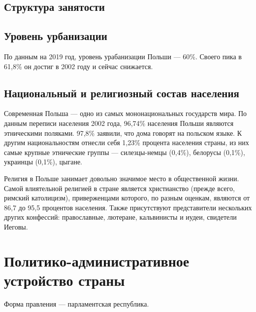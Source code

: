 \documentclass[12pt]{article}
\begin{document}
\subsection{Структура занятости}

\subsection{Уровень урбанизации}
По данным на 2019 год, уровень урабанизации Польши --- 60\%.
Своего пика в 61,8\% он достиг в 2002 году и сейчас снижается.

\subsection{Национальный и религиозный состав населения}
Современная Польша --- одно из самых мононациональных государств мира.
По данным переписи населения 2002 года, 96,74\% населения Польши являются этническими поляками.
97,8\% заявили, что дома говорят на польском языке.
К другим национальностям отнесли себя 1,23\% процента населения страны, из них самые крупные этнические группы --- силезцы-немцы (0,4\%), белорусы (0,1\%), украинцы (0,1\%), цыгане.

Религия в Польше занимает довольно значимое место в общественной жизни.
Самой влиятельной религией в стране является христианство (прежде всего, римский католицизм), приверженцами которого, по разным оценкам, являются от 86,7 до 95,5 процентов населения.
Также присутствуют представители нескольких других конфессий: православные, лютеране, кальвинисты и иудеи, свидетели Иеговы.
\section{Политико-административное устройство страны}
Форма правления --- парламентская республика.
\end{document}
